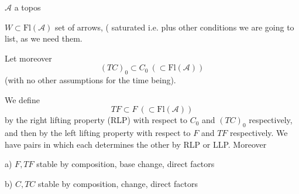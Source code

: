 $\mathcal A$ a topos

$W\subset\mathrm{Fl}(\mathcal A)$ set of arrows, ( saturated i.e.
plus other conditions we are going to list, as we need them.

 Let moreover 
\[
(TC)_0\subset C_0\ (\subset\mathrm{Fl}(\mathcal A))
\]
(with no other assumptions for the time being).


We define 
\[
TF\subset F\ (\subset\mathrm{Fl}(\mathcal A))
\]
by the right lifting property (RLP) with respect to  $C_0$ and $(TC)_0$ respectively, and then
by the  left lifting property  with respect to $F$ and $TF$ respectively. We have pairs
in which each  determines the other by RLP  or LLP.  Moreover

a) $F,TF$ stable by composition, base change, direct factors

b) $C,TC$ stable by composition,  change, direct factors

